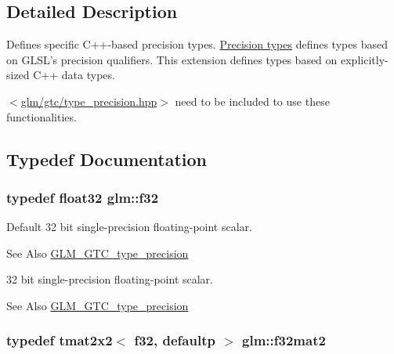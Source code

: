 \subsection{Detailed Description}
Defines specific C++-\/based precision types. \hyperlink{group__core__precision}{Precision types} defines types based on G\-L\-S\-L's precision qualifiers. This extension defines types based on explicitly-\/sized C++ data types.

$<$\hyperlink{type__precision_8hpp}{glm/gtc/type\-\_\-precision.\-hpp}$>$ need to be included to use these functionalities. 

\subsection{Typedef Documentation}
\hypertarget{group__gtc__type__precision_ga0ec999b57f5330d9021256e96038df04}{
\subsubsection[{f32}]{\setlength{\rightskip}{0pt plus 5cm}typedef float32 {\bf glm\-::f32}}}\label{group__gtc__type__precision_ga0ec999b57f5330d9021256e96038df04}
Default 32 bit single-\/precision floating-\/point scalar. \begin{DoxySeeAlso}{See Also}
\hyperlink{group__gtc__type__precision}{G\-L\-M\-\_\-\-G\-T\-C\-\_\-type\-\_\-precision}
\end{DoxySeeAlso}
32 bit single-\/precision floating-\/point scalar. \begin{DoxySeeAlso}{See Also}
\hyperlink{group__gtc__type__precision}{G\-L\-M\-\_\-\-G\-T\-C\-\_\-type\-\_\-precision} 
\end{DoxySeeAlso}
\hypertarget{group__gtc__type__precision_ga29b40a1141234160a627a540eceedd31}{
\subsubsection[{f32mat2}]{\setlength{\rightskip}{0pt plus 5cm}typedef tmat2x2$<$ f32, defaultp $>$ {\bf glm\-::f32mat2}}}\label{group__gtc__type__precision_ga29b40a1141234160a627a540eceedd31}
